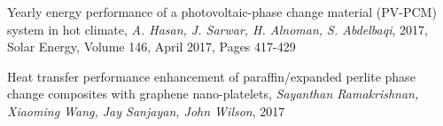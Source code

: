 \documentclass{scrartcl}[12pt, halfparskip]
\begin{document}
\newpage
\begin{thebibliography}{9}

  
  Yearly energy performance of a photovoltaic-phase change material
  (PV-PCM) system in hot climate, 
  \textit{A. Hasan, J. Sarwar, H. Alnoman, S. Abdelbaqi},
  2017,
  Solar Energy, Volume 146, April 2017, Pages 417-429

   Heat transfer performance enhancement of paraffin/expanded
   perlite phase change composites with graphene nano-platelets,
   \textit{Sayanthan Ramakrishnan, Xiaoming Wang, Jay Sanjayan, John Wilson},
   2017
  
  
\end{thebibliography}
\end{document}
